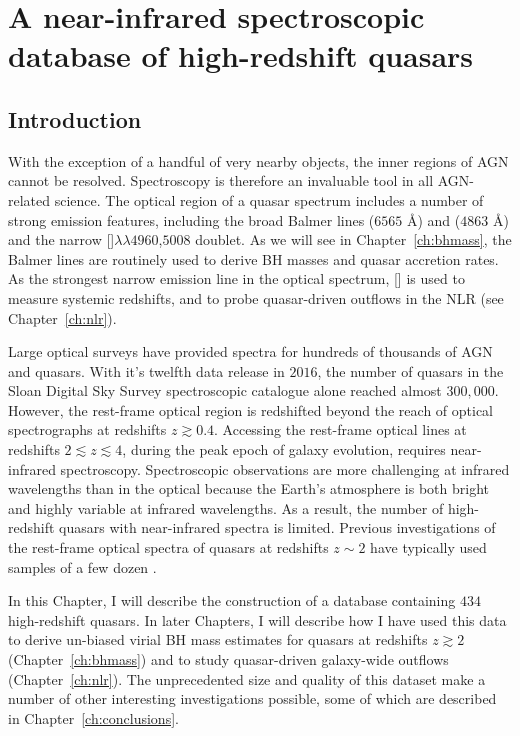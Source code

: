 
\chapter{A near-infrared spectroscopic database of high-redshift quasars}
\label{ch:nirsample}

\section{Introduction}

With the exception of a handful of very nearby objects, the inner regions of AGN cannot be resolved. 
Spectroscopy is therefore an invaluable tool in all AGN-related science. 
The optical region of a quasar spectrum includes a number of strong emission features, including the broad Balmer lines \hans ($6565$ \AA) and \hbns ($4863$ \AA) and the narrow []$\lambda\lambda$$4960$,$5008$ doublet. 
As we will see in Chapter~\ref{ch:bhmass}, the Balmer lines are routinely used to derive BH masses and quasar accretion rates. 
As the strongest narrow emission line in the optical spectrum, [] is used to measure systemic redshifts, and to probe quasar-driven outflows in the NLR (see Chapter~\ref{ch:nlr}). 

Large optical surveys have provided spectra for hundreds of thousands of AGN and quasars. 
With it's twelfth data release in $2016$, the number of quasars in the Sloan Digital Sky Survey \citep[SDSS;][]{york00} spectroscopic catalogue alone reached almost $300,000$. 
However, the rest-frame optical region is redshifted beyond the reach of optical spectrographs at redshifts $z \gtrsim0.4$. 
Accessing the rest-frame optical lines at redshifts $2 \lesssim z \lesssim 4$, during the peak epoch of galaxy evolution, requires near-infrared spectroscopy.  
Spectroscopic observations are more challenging at infrared wavelengths than in the optical because the Earth's atmosphere is both bright and highly variable at infrared wavelengths. 
As a result, the number of high-redshift quasars with near-infrared spectra is limited. 
Previous investigations of the rest-frame optical spectra of quasars at redshifts $z\sim2$ have typically used samples of a few dozen \citep[e.g.][]{marziani09,shen12,shen16a}. 

In this Chapter, I will describe the construction of a database containing $434$ high-redshift quasars. 
In later Chapters, I will describe how I have used this data to derive un-biased virial BH mass estimates for quasars at redshifts $z \gtrsim 2$ (Chapter~\ref{ch:bhmass}) and to study quasar-driven galaxy-wide outflows (Chapter~\ref{ch:nlr}). 
The unprecedented size and quality of this dataset make a number of other interesting investigations possible, some of which are described in Chapter~\ref{ch:conclusions}. 

